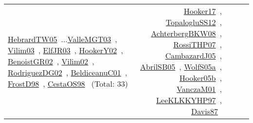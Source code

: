 {\begin{longtable}{p{3cm}r>{\raggedright\arraybackslash}p{6cm}>{\raggedright\arraybackslash}p{6cm}>{\raggedright\arraybackslash}p{8cm}}
\href{../works/HebrardTW05.pdf}{HebrardTW05}~\cite{HebrardTW05}...\href{../works/ValleMGT03.pdf}{ValleMGT03}~\cite{ValleMGT03}, \href{../works/Vilim03.pdf}{Vilim03}~\cite{Vilim03}, \href{../works/ElfJR03.pdf}{ElfJR03}~\cite{ElfJR03}, \href{../works/HookerY02.pdf}{HookerY02}~\cite{HookerY02}, \href{../works/BenoistGR02.pdf}{BenoistGR02}~\cite{BenoistGR02}, \href{../works/Vilim02.pdf}{Vilim02}~\cite{Vilim02}, \href{../works/RodriguezDG02.pdf}{RodriguezDG02}~\cite{RodriguezDG02}, \href{../works/BeldiceanuC01.pdf}{BeldiceanuC01}~\cite{BeldiceanuC01}, \href{../works/FrostD98.pdf}{FrostD98}~\cite{FrostD98}, \href{../works/CestaOS98.pdf}{CestaOS98}~\cite{CestaOS98} (Total: 33) & \href{../works/Hooker17.pdf}{Hooker17}~\cite{Hooker17}, \href{../works/TopalogluSS12.pdf}{TopalogluSS12}~\cite{TopalogluSS12}, \href{../works/AchterbergBKW08.pdf}{AchterbergBKW08}~\cite{AchterbergBKW08}, \href{../works/RossiTHP07.pdf}{RossiTHP07}~\cite{RossiTHP07}, \href{../works/CambazardJ05.pdf}{CambazardJ05}~\cite{CambazardJ05}, \href{../works/AbrilSB05.pdf}{AbrilSB05}~\cite{AbrilSB05}, \href{../works/WolfS05a.pdf}{WolfS05a}~\cite{WolfS05a}, \href{../works/Hooker05b.pdf}{Hooker05b}~\cite{Hooker05b}, \href{../works/VanczaM01.pdf}{VanczaM01}~\cite{VanczaM01}, \href{../works/LeeKLKKYHP97.pdf}{LeeKLKKYHP97}~\cite{LeeKLKKYHP97}, \href{../works/Davis87.pdf}{Davis87}~\cite{Davis87}\\

\end{longtable}}
